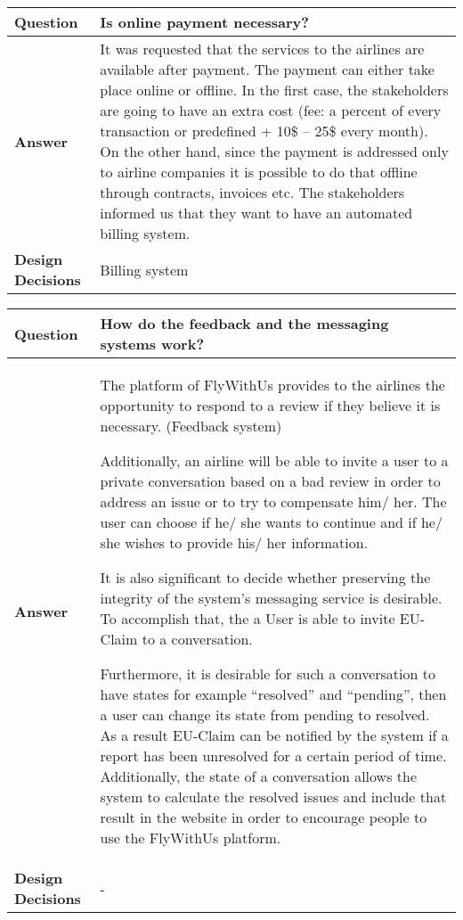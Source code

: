 \begin{longtable}{| l |  p{12cm} |}
\hline
\textbf{Question} & \textbf{Is online payment necessary?} \\ \hline
\textbf{Answer} &
	 It was requested that the services to the airlines are available after payment. The payment can either take place online or offline. In the first case, 
	the stakeholders are going to have an extra cost (fee: a percent of every transaction or predefined + 10\$ – 25\$ every month). On the other hand, since the 
	payment is addressed only to airline companies it is possible to do that offline through contracts, invoices etc.
	The stakeholders informed us that they want to have an automated billing system. \\ \hline
\textbf{Design Decisions} & Billing system \\ \hline
\end{longtable}

\newpage
\begin{longtable}{| l |  p{12cm} |}
\hline
\textbf{Question} & \textbf{How do the feedback and the messaging systems work?} \\ \hline
\textbf{Answer} &
	The platform of FlyWithUs provides to the airlines the opportunity to respond to a review if they believe it is necessary. (Feedback system)\newline

	Additionally, an airline will be able to invite a user to a private conversation based on a bad review in order to address an issue or to try to compensate him/ her. The user can choose 
	if he/ she wants to continue and if he/ she wishes to provide his/ her information. \newline

	It is also significant to decide whether preserving the integrity of the system's messaging service is desirable. To accomplish that, the a User is able to invite EU-Claim to a conversation. \newline

	Furthermore, it is desirable for such a conversation to have states for example “resolved” and “pending”, then a user can change its state from pending to resolved. As a result 
	EU-Claim can be notified by the system if a report has been unresolved for a certain period of time. Additionally, the state of a conversation allows the system to calculate the resolved 
	issues and include that result in the website in order to encourage people to use the FlyWithUs platform. \\ \hline
\textbf{Design Decisions} & - \\ \hline
\end{longtable}


